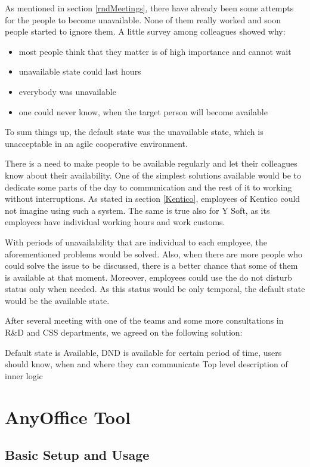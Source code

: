 \documentclass[11pt,singleside]{myfithesis2}
\begin{document}
As mentioned in section \ref{rndMeetings}, there have already been some attempts for the people to become unavailable. None of them really worked and soon people started to ignore them. A little survey among colleagues showed why:
\begin{itemize}
	\item most people think that they matter is of high importance and cannot wait
	\item unavailable state could last hours
	\item everybody was unavailable
	\item one could never know, when the target person will become available
\end{itemize}
To sum things up, the default state was the unavailable state, which is unacceptable in an agile cooperative environment.

There is a need to make people to be available regularly and let their colleagues know about their availability. One of the simplest solutions available would be to dedicate some parts of the day to communication and the rest of it to working without interruptions. As stated in section \ref{Kentico}, employees of Kentico could not imagine using such a system. The same is true also for Y Soft, as its employees have individual working hours and work customs. 

With periods of unavailability that are individual to each employee, the aforementioned problems would be solved. Also, when there are more people who could solve the issue to be discussed, there is a better chance that some of them is available at that moment. Moreover, employees could use the do not disturb status only when needed. As this status would be only temporal, the default state would be the available state.

After several meeting with one of the teams and some more consultations in R\&D and CSS departments, we agreed on the following solution:



Default state is Available, DND is available for certain period of time, users should know, when and where they can communicate
Top level description of inner logic

\chapter{AnyOffice Tool}

	\section{Basic Setup and Usage}
\end{document}
